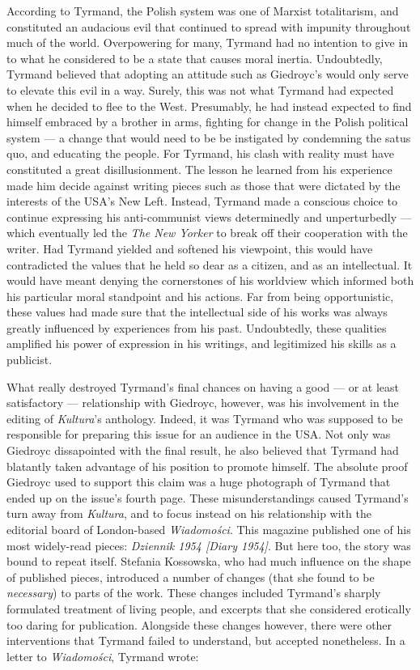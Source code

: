 \begin{paper}
\noindent According to Tyrmand, the Polish system was one of Marxist totalitarism, and constituted an audacious evil that continued to spread with impunity throughout much of the world. Overpowering for many, Tyrmand  had no intention to give in to
what he considered to be a state that causes moral inertia. Undoubtedly, Tyrmand believed that
adopting an attitude such as Giedroyc's would only serve to elevate this evil in a way. Surely, this was not what Tyrmand had expected when he decided to flee to the
West. Presumably, he had instead expected to find himself embraced by a brother in arms, fighting for change in the Polish political system --- a change
that would need to be be instigated by condemning the satus quo, and educating the people. For Tyrmand, his
clash with reality must have constituted a great
disillusionment. The lesson he learned from his experience made him decide against  writing
pieces such as those that were dictated by the interests of the USA's New Left. Instead, Tyrmand made a conscious choice to continue expressing his
anti-communist views determinedly and unperturbedly --- which eventually led the
 \emph{The New Yorker} to break off their cooperation with the writer.
Had Tyrmand yielded and softened his viewpoint, this would have contradicted
the values that he held so dear as a citizen, and as an
intellectual. It would have meant denying the cornerstones of his worldview which
informed both his particular moral standpoint and his actions. Far from being opportunistic, these values had made sure that the intellectual side of his works was always greatly influenced by experiences from his past. Undoubtedly, these qualities
amplified his power of expression in his writings, and legitimized his skills as a 
publicist.

What really destroyed Tyrmand's final chances on having a good --- or at least
satisfactory --- relationship with Giedroyc, however, was his involvement in the
editing of \emph{Kultura}'s anthology. Indeed, it was Tyrmand who was supposed to be
responsible for preparing this issue for an audience in the USA. Not only was Giedroyc dissapointed
with the final result, he also believed that Tyrmand had blatantly taken advantage of his position to promote himself. The absolute proof Giedroyc used to support this claim was a huge
photograph of Tyrmand that ended up on the issue's fourth page. These misunderstandings
caused Tyrmand's turn away from \emph{Kultura}, and to focus instead on his relationship with  the editorial board of London-based
\emph{Wiadomości}. This magazine published one of his most
widely-read pieces: \emph{Dziennik 1954 [Diary 1954]}. But here too, 
the story was bound to repeat itself. Stefania Kossowska, who had much influence on
the shape of published pieces, introduced a number of changes (that she found to be \emph{necessary}) to parts of the work. These changes included Tyrmand's
sharply formulated treatment of living people, and excerpts that she
considered erotically too daring for publication. Alongside these changes however, there were other interventions that Tyrmand failed to understand, but accepted nonetheless. In a letter to \emph{Wiadomości}, Tyrmand wrote: 


\end{paper}
